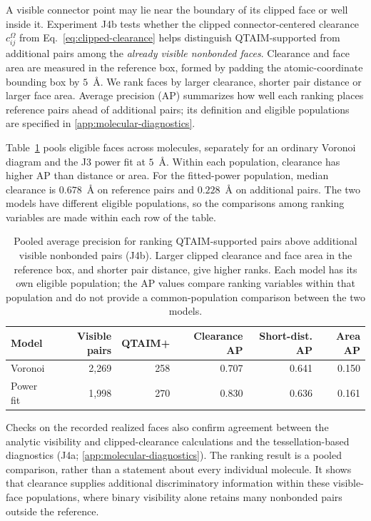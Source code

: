 A visible connector point may lie near the boundary of its clipped face or well inside it. Experiment J4b tests whether the clipped connector-centered clearance $c_{ij}^{\Omega}$ from Eq.~\eqref{eq:clipped-clearance} helps distinguish QTAIM-supported from additional pairs among the \emph{already visible nonbonded faces}. Clearance and face area are measured in the reference box, formed by padding the atomic-coordinate bounding box by $5$~\AA{}. We rank faces by larger clearance, shorter pair distance or larger face area. Average precision (AP) summarizes how well each ranking places reference pairs ahead of additional pairs; its definition and eligible populations are specified in \ref{app:molecular-diagnostics}.

Table~\ref{tab:molecular-clearance-ranking} pools eligible faces across molecules, separately for an ordinary Voronoi diagram and the J3 power fit at $5$~\AA{}. Within each population, clearance has higher AP than distance or area. For the fitted-power population, median clearance is $0.678$~\AA{} on reference pairs and $0.228$~\AA{} on additional pairs. The two models have different eligible populations, so the comparisons among ranking variables are made within each row of the table.

\begin{table}[htbp]
\centering
\footnotesize
\setlength{\tabcolsep}{4.5pt}
\caption{Pooled average precision for ranking QTAIM-supported pairs above additional visible nonbonded pairs (J4b). Larger clipped clearance and face area in the reference box, and shorter pair distance, give higher ranks. Each model has its own eligible population; the AP values compare ranking variables within that population and do not provide a common-population comparison between the two models.}
\label{tab:molecular-clearance-ranking}
\begin{tabular}{@{}lrrrrr@{}}
\toprule
Model & Visible pairs & QTAIM+ & Clearance AP & Short-dist. AP & Area AP \\
\midrule
Voronoi & 2,269 & 258 & 0.707 & 0.641 & 0.150 \\
Power fit & 1,998 & 270 & 0.830 & 0.636 & 0.161 \\
\bottomrule
\end{tabular}
\end{table}

Checks on the recorded realized faces also confirm agreement between the analytic visibility and clipped-clearance calculations and the tessellation-based diagnostics (J4a; \ref{app:molecular-diagnostics}). The ranking result is a pooled comparison, rather than a statement about every individual molecule. It shows that clearance supplies additional discriminatory information within these visible-face populations, where binary visibility alone retains many nonbonded pairs outside the reference.

